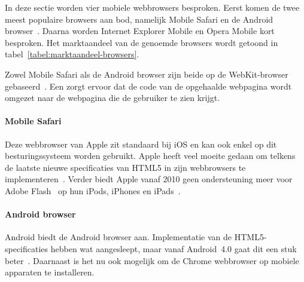 In deze sectie worden vier mobiele webbrowsers besproken. 
Eerst komen de twee meest populaire browsers aan bod, namelijk Mobile Safari en de Android browser~\cite{Hales2012}. 
Daarna worden Internet Explorer Mobile en Opera Mobile kort besproken. 
Het marktaandeel van de genoemde browsers wordt getoond in tabel~\ref{tabel:marktaandeel-browsers}.

Zowel Mobile Safari als de Android browser zijn beide op de WebKit-browser  gebaseerd~\cite{Oeflman2011}. 
Een  zorgt ervoor dat de code van de opgehaalde webpagina wordt omgezet naar de webpagina die de gebruiker te zien krijgt. 

\begin{table}
\centering
{}
\caption{Marktaandeel mobiele webbrowsers in mei 2013~\cite{NetApplications2012}.}
\label{tabel:marktaandeel-browsers}
\end{table}

\paragraph{Mobile Safari}
\label{sec:mobile-safari}
Deze webbrowser van Apple zit standaard bij iOS en kan ook enkel op dit besturingssysteem worden gebruikt. 
Apple heeft veel moeite gedaan om telkens de laatste nieuwe specificaties van HTML5 in zijn webbrowsers te implementeren~\cite{Hales2012}. 
Verder biedt Apple vanaf 2010 geen ondersteuning meer voor Adobe Flash~\cite{Adobe2013} op hun iPods, iPhones en iPads~\cite{Jobs2010}.

\paragraph{Android browser}
\label{sec:android-browser}
Android biedt de Android browser aan. 
Implementatie van de HTML5-specificaties hebben wat aangesleept, maar vanaf Android~4.0 gaat dit een stuk beter~\cite{Hales2012}. 
Daarnaast is het nu ook mogelijk om de Chrome webbrowser op mobiele apparaten te installeren.

